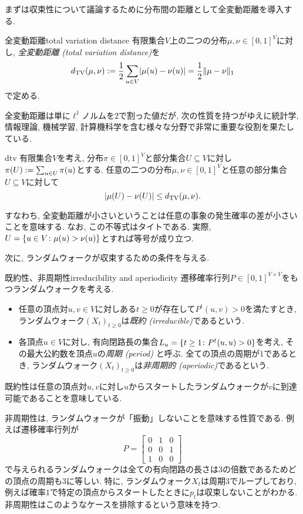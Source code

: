 まずは収束性について議論するために分布間の距離として全変動距離を導入する.
\begin{definition}{全変動距離}{total variation distance}
  有限集合$V$上の二つの分布$\mu,\nu \in[0,1]^V$に対し, \emph{全変動距離 (total variation distance)}を
  \[
    \dtv (\mu ,\nu ) \defeq \frac{1}{2} \sum_{u\in V}\abs{\mu(u) - \nu(u)} = \frac{1}{2} \norm{\mu - \nu}_1
  \]
  で定める.
\end{definition}
全変動距離は単に$\ell^1$ノルムを$2$で割った値だが, 次の性質を持つがゆえに統計学, 情報理論, 機械学習, 計算機科学を含む様々な分野で非常に重要な役割を果たしている.
\begin{proposition}{}{dtv}
  有限集合$V$を考え, 分布$\pi\in[0,1]^V$と部分集合$U\subseteq V$に対し$\pi(U)\defeq\sum_{u\in U}\pi(u)$とする.
  任意の二つの分布$\mu,\nu\in[0,1]^V$と任意の部分集合$U\subseteq V$に対して
  \[
    \abs*{ \mu(U) - \nu(U) } \le \dtv(\mu,\nu).
  \]
\end{proposition}
すなわち,
全変動距離が小さいということは任意の事象の発生確率の差が小さいことを意味する.
なお, この不等式はタイトである.
実際, $U=\cbra*{ u\in V \colon \mu(u) > \nu(u) }$とすれば等号が成り立つ.

次に, ランダムウォークが収束するための条件を与える.
\begin{definition}{既約性、非周期性}{irreducibility and aperiodicity}
  遷移確率行列$P \in [0,1]^{V\times V}$をもつランダムウォークを考える.
  \begin{itemize}
    \item 任意の頂点対$u,v\in V$に対しある$t \ge 0$が存在して$P^t(u,v)>0$を満たすとき, ランダムウォーク$(X_t)_{t\ge 0}$は\emph{既約 (irreducible)}であるという.
    \item 各頂点$u\in V$に対し, 有向閉路長の集合$L_u = \cbra*{ t \ge 1 \colon P^t(u,u) > 0}$を考え, その最大公約数を頂点$u$の\emph{周期 (period)} と呼ぶ. 全ての頂点の周期が$1$であるとき, ランダムウォーク$(X_t)_{t\ge 0}$は\emph{非周期的 (aperiodic)}であるという.
  \end{itemize}
\end{definition}
%
既約性は任意の頂点対$u,v$に対し$u$からスタートしたランダムウォークが$v$に到達可能であることを意味している.

非周期性は, ランダムウォークが「振動」しないことを意味する性質である.
例えば遷移確率行列が
\[
  P = \begin{bmatrix}
    0 & 1 & 0 \\
    0 & 0 & 1 \\
    1 & 0 & 0
  \end{bmatrix}
\]
で与えられるランダムウォークは全ての有向閉路の長さは$3$の倍数であるためどの頂点の周期も$3$に等しい.
特に, ランダムウォーク$X_t$は周期$3$でループしており, 例えば確率$1$で特定の頂点からスタートしたときに$p_t$は収束しないことがわかる.
非周期性はこのようなケースを排除するという意味を持つ.


